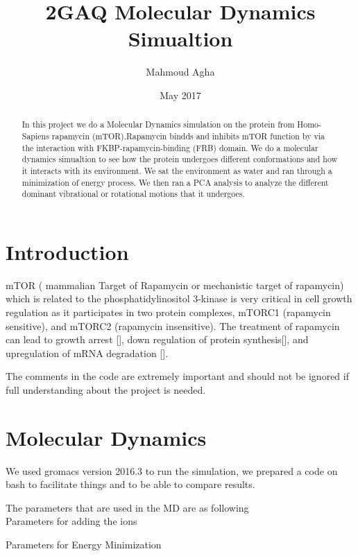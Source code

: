 \documentclass{article}
\title{2GAQ Molecular Dynamics Simualtion}
\author{Mahmoud Agha}
\date{May 2017}
\begin{document}
\maketitle
\begin{abstract}
    In this project we do a Molecular Dynamics simulation on the protein from Homo-Sapiens rapamycin (mTOR).Rapamycin bindds and inhibits mTOR function by via the interaction with FKBP-rapamycin-binding (FRB) domain. We do a molecular dynamics simualtion to see how the protein undergoes different conformations and how it interacts with its environment. We sat the environment as water and ran through a minimization of energy process. We then ran a PCA analysis to analyze the different dominant vibrational or rotational motions that it undergoes.
\end{abstract}

\section{Introduction}
mTOR ( mammalian Target of Rapamycin or mechanistic target of rapamycin) which is related to the phosphatidylinositol 3-kinase is very critical in cell growth regulation as it participates in two protein complexes, mTORC1 (rapamycin sensitive), and mTORC2 (rapamycin insensitive). The treatment of rapamycin can lead to growth arrest [], down regulation of protein synthesis[], and upregulation of mRNA degradation [].


The comments in the code are extremely important and should not be ignored if full understanding about the project is needed.
\section{Molecular Dynamics}
We used gromacs version 2016.3 to run the simulation, we prepared a code on bash to facilitate things and to be able to compare results.




The parameters that are used in the MD are as following \\
Parameters for adding the ions

 
 Parameters for Energy Minimization
 
 
\end{document}
